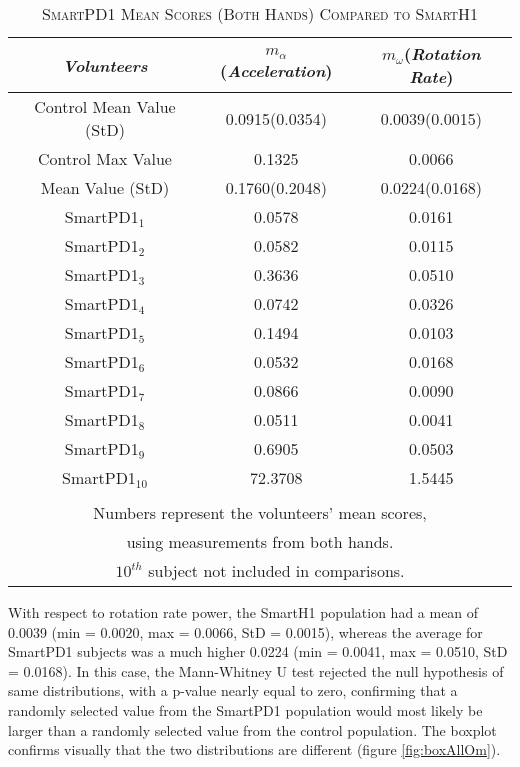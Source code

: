 \begin{table}[!hbp]
\centering
\caption{\textsc{SmartPD1 Mean Scores (Both Hands) Compared to SmartH1}}
\begin{tabular*}{1\textwidth}{@{\extracolsep{\fill}} c  c  c}
 	\textit{Volunteers} & $m_{\alpha}$(\textit{Acceleration}) & $m_{\omega}$(\textit{Rotation Rate})\\
	\hline 	\hline 		
 	Control Mean Value (StD) & 0.0915(0.0354) & 0.0039(0.0015) \\ 
 	\hline
 	Control Max Value & 0.1325 & 0.0066 \\ 
 	\hline
 	Mean Value (StD) & 0.1760(0.2048) & 0.0224(0.0168) \\ 
 	\hline
 	\gls{SmartPD1}$_{1}$ & 0.0578 & 	0.0161 \\
 	\gls{SmartPD1}$_{2}$ & 0.0582 & 	0.0115 \\
 	\gls{SmartPD1}$_{3}$ & 0.3636 & 	0.0510 \\
 	\gls{SmartPD1}$_{4}$ & 0.0742 & 	0.0326 \\
 	\gls{SmartPD1}$_{5}$ & 0.1494 & 	0.0103 \\
 	\gls{SmartPD1}$_{6}$ & 0.0532 & 	0.0168 \\
 	\gls{SmartPD1}$_{7}$ & 0.0866 & 	0.0090 \\
 	\gls{SmartPD1}$_{8}$ & 0.0511 & 	0.0041 \\
 	\gls{SmartPD1}$_{9}$ & 0.6905 & 	0.0503 \\
 	\gls{SmartPD1}$_{10}$ & 72.3708 &	1.5445 \\
 	 &  & \\
	\multicolumn{3}{c}{Numbers represent the volunteers' mean scores, } 	\\
	\multicolumn{3}{c}{using measurements from both hands.} \\
	\multicolumn{3}{c}{$10^{th}$ subject not included in comparisons.} \\
\end{tabular*}
\label{table:allSmartPD1}
\end{table}

With respect to rotation rate power, the \gls{SmartH1} population had a mean of 0.0039 (min = 0.0020, max = 0.0066, StD = 0.0015), whereas the average for \gls{SmartPD1} subjects was a much higher 0.0224 (min = 0.0041, max = 0.0510, StD = 0.0168). In this case, the Mann-Whitney U test rejected the null hypothesis of same distributions, with a p-value nearly equal to zero, confirming that a randomly selected value from the \gls{SmartPD1} population would most likely be larger than a randomly selected value from the control population. The boxplot confirms visually that the two distributions are different (figure \ref{fig:boxAllOm}). 

